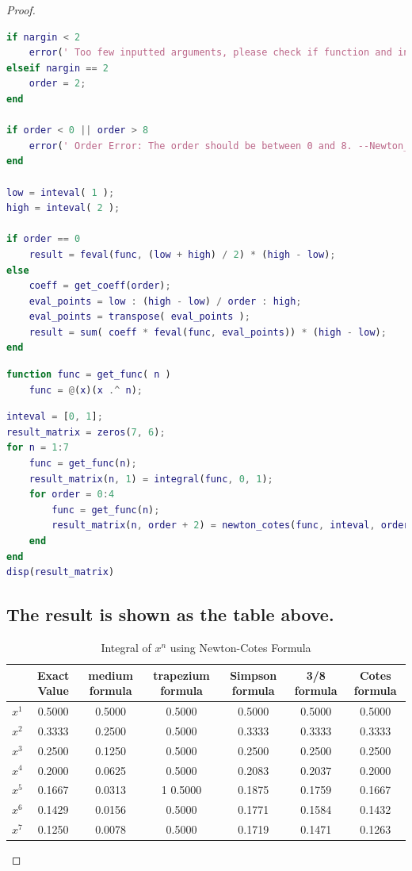 \documentclass[48pt]{article}
\begin{document}
\begin{proof}
\begin{lstlisting}[language = {MATLAB}]
if nargin < 2
    error(' Too few inputted arguments, please check if function and inteval for integrating have been inputted or not  -- Newton_Cotes');
elseif nargin == 2
    order = 2;
end

if order < 0 || order > 8
    error(' Order Error: The order should be between 0 and 8. --Newton_Cotes ');
end

low = inteval( 1 );
high = inteval( 2 );

if order == 0
    result = feval(func, (low + high) / 2) * (high - low);
else
    coeff = get_coeff(order);
    eval_points = low : (high - low) / order : high;
    eval_points = transpose( eval_points );
    result = sum( coeff * feval(func, eval_points)) * (high - low);
end
\end{lstlisting}

\begin{lstlisting}[language = {MATLAB}]
function func = get_func( n )
    func = @(x)(x .^ n);
\end{lstlisting}

\begin{lstlisting}[language = {MATLAB}]
% Homework1.3.1
inteval = [0, 1];
result_matrix = zeros(7, 6);
for n = 1:7
    func = get_func(n);
    result_matrix(n, 1) = integral(func, 0, 1);
    for order = 0:4
        func = get_func(n);
        result_matrix(n, order + 2) = newton_cotes(func, inteval, order);
    end
end
disp(result_matrix)
\end{lstlisting}

\subsection{The result is shown as the table above.}

\begin{table}
\begin{tabular}{c|c|c|c|c|c|c}
    \hline
    & Exact Value & medium formula & trapezium formula & Simpson formula & 3/8 formula & Cotes formula \\
    \hline
    $x^{1}$ & 0.5000 & 0.5000 & 0.5000 & 0.5000 & 0.5000 & 0.5000 \\
    \hline
    $x^{2}$   & 0.3333  &  0.2500  &  0.5000 &  0.3333  &  0.3333  &  0.3333 \\
    \hline
    $x^{3}$ & 0.2500  &  0.1250 &   0.5000 & 0.2500  &  0.2500    &    0.2500 \\
    \hline
    $x^{4}$  & 0.2000 &   0.0625  &  0.5000  & 0.2083 &   0.2037    &   0.2000 \\
    \hline
    $x^{5}$   &  0.1667  &  0.0313 &  1 0.5000 &   0.1875 &  0.1759  &  0.1667 \\
    \hline
    $x^{6}$  &   0.1429  &  0.0156  &  0.5000  &  0.1771  &  0.1584  &  0.1432 \\
    \hline
    $x^{7}$   &  0.1250  &  0.0078  &  0.5000  &  0.1719   & 0.1471  &  0.1263 \\
    \hline
    \end{tabular}
    \caption{Integral of $x^{n}$ using Newton-Cotes Formula}
    \end{table}
\end{proof}
\end{document}
